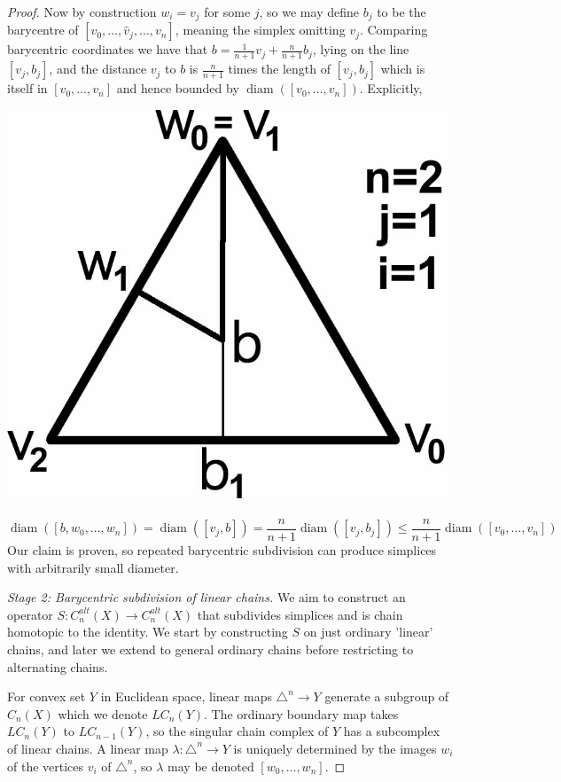 \documentclass[11pt,a4paper,twoside]{article}
\theoremstyle{plain}
\theoremstyle{definition}
\theoremstyle{definition}
\theoremstyle{definition}
\theoremstyle{definition}
\theoremstyle{definition}
\DeclareMathOperator{\diam}{diam}
\begin{document}
\begin{proof}
\begin{minipage}{0.7\textwidth}
Now by construction $w_i=v_j$ for some $j$, so we may define $b_j$ to be the barycentre of $[v_0,\dots,\widehat{v}_j,\dots,v_n]$, meaning the simplex omitting $v_j$. Comparing barycentric coordinates we have that $b=\frac1{n\!+\!1}v_j+\frac n{n\!+\!1}b_j$, lying on the line $[v_j,b_j]$, and the distance $v_j$ to $b$ is $\frac n{n\!+\!1}$ times the length of $[v_j,b_j]$ which is itself in $[v_0,\dots,v_n]$ and hence bounded by $\diam([v_0,\dots,v_n])$. Explicitly,\end{minipage}
\begin{minipage}{0.3\textwidth}
\centering
\includegraphics[scale=0.14]{Images/BarycentreOfSubdivision.jpg}
\end{minipage}
$$\diam([b,w_0,\dots,w_n])=\diam([v_j,b])=\frac n{n\!+\!1}\diam([v_j,b_j])\leq \frac n{n\!+\!1}\diam([v_0,\dots,v_n])$$
Our claim is proven, so repeated barycentric subdivision can produce simplices with arbitrarily small diameter.

\emph{Stage 2: Barycentric subdivision of linear chains.}
We aim to construct an operator $S\!:\!C_n^{alt}(X)\!\longrightarrow\!C_n^{alt}(X)$ that subdivides simplices and is chain homotopic to the identity. We start by constructing $S$ on just ordinary 'linear' chains, and later we extend to general ordinary chains before restricting to alternating chains.

For convex set $Y$ in Euclidean space, linear maps $\triangle^n\!\longrightarrow\!Y$ generate a subgroup of $C_n(X)$ which we denote $LC_n(Y)$. The ordinary boundary map takes $LC_n(Y)$ to $LC_{n\!-\!1}(Y)$, so the singular chain complex of $Y$ has a subcomplex of linear chains. A linear map $\lambda\!:\!\triangle^n\!\longrightarrow\!Y$ is uniquely determined by the images $w_i$ of the vertices $v_i$ of $\triangle^n$, so $\lambda$ may be denoted $[w_0,\dots,w_n]$. 


\end{proof}
\end{document}
